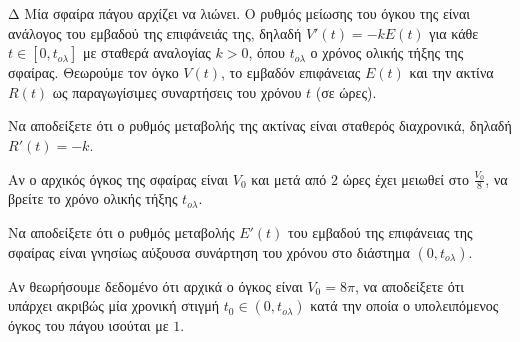 \begin{thema}{Δ}
Μία σφαίρα πάγου αρχίζει να λιώνει. Ο ρυθμός μείωσης του όγκου της είναι ανάλογος του εμβαδού της επιφάνειάς της, δηλαδή $V'(t) = -k E(t)$ για κάθε $t \in [0, t_{ολ}]$ με σταθερά αναλογίας $k > 0$, όπου $t_{ολ}$ ο χρόνος ολικής τήξης της σφαίρας. Θεωρούμε τον όγκο $V(t)$, το εμβαδόν επιφάνειας $E(t)$ και την ακτίνα $R(t)$ ως παραγωγίσιμες συναρτήσεις του χρόνου $t$ (σε ώρες).
\begin{erwthma}
    \item Να αποδείξετε ότι ο ρυθμός μεταβολής της ακτίνας είναι σταθερός διαχρονικά, δηλαδή $R'(t) = -k$.
    \item Αν ο αρχικός όγκος της σφαίρας είναι $V_0$ και μετά από $2$ ώρες έχει μειωθεί στο $\frac{V_0}{8}$, να βρείτε το χρόνο ολικής τήξης $t_{ολ}$.
    \item Να αποδείξετε ότι ο ρυθμός μεταβολής $E'(t)$ του εμβαδού της επιφάνειας της σφαίρας είναι γνησίως αύξουσα συνάρτηση του χρόνου στο διάστημα $(0, t_{ολ})$.
    \item Αν θεωρήσουμε δεδομένο ότι αρχικά ο όγκος είναι $V_0 = 8\pi$, να αποδείξετε ότι υπάρχει ακριβώς μία χρονική στιγμή $t_0 \in (0, t_{ολ})$ κατά την οποία ο υπολειπόμενος όγκος του πάγου ισούται με $1$.
\end{erwthma}
\end{thema}
